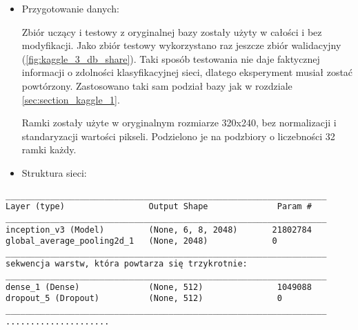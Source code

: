 {\parindent0pt %
\begin{itemize}
\item Przygotowanie danych:

Zbiór uczący i testowy z oryginalnej bazy zostały użyty w całości i bez modyfikacji. Jako zbiór testowy wykorzystano raz jeszcze zbiór walidacyjny (\ref{fig:kaggle_3_db_share}). Taki sposób testowania nie daje faktycznej informacji o zdolności klasyfikacyjnej sieci, dlatego eksperyment musiał zostać powtórzony. Zastosowano taki sam podział bazy jak w rozdziale \ref{sec:section_kaggle_1}.

Ramki zostały użyte w oryginalnym rozmiarze 320x240, bez normalizacji i standaryzacji wartości pikseli. Podzielono je na podzbiory o liczebności 32 ramki każdy.
\item Struktura sieci:
\end{itemize}

\newsavebox\myvfff
\begin{lrbox}{\myvfff}
\setlength{\myminipagewidth}{0.9\linewidth} %
\setlength{\myminipagecentering}{(\linewidth-\myminipagewidth)/2}
\noindent\hspace{\myminipagecentering}\begin{minipage}{\myminipagewidth}
\begin{verbatim}
_________________________________________________________________
Layer (type)                 Output Shape              Param #   
_________________________________________________________________
inception_v3 (Model)         (None, 6, 8, 2048)       21802784  
global_average_pooling2d_1   (None, 2048)             0           
_________________________________________________________________
sekwencja warstw, która powtarza się trzykrotnie:
_________________________________________________________________
dense_1 (Dense)              (None, 512)               1049088     
dropout_5 (Dropout)          (None, 512)               0        
_________________________________________________________________
.....................

\end{verbatim} 
\end{minipage}\end{lrbox}
\resizebox{0.75\textwidth}{!}{\usebox\myvfff}

}
